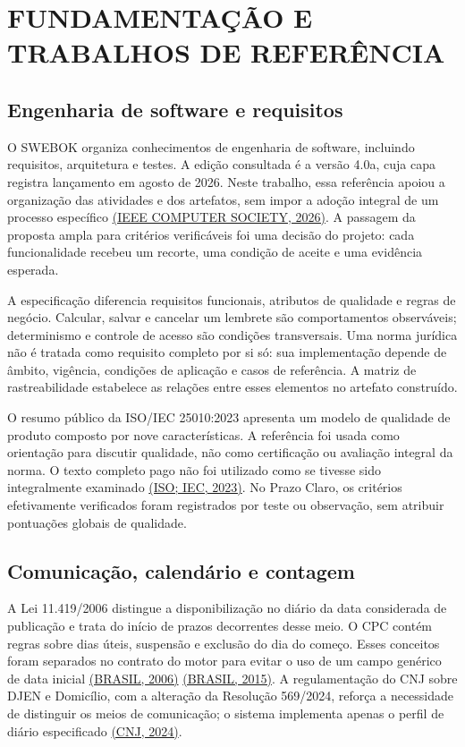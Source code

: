 \chapter{FUNDAMENTAÇÃO E TRABALHOS DE REFERÊNCIA}
\label{chapter-2}
\section{Engenharia de software e requisitos}
\label{section-2-1}
O SWEBOK organiza conhecimentos de engenharia de software, incluindo requisitos, arquitetura e testes. A edição consultada é a versão 4.0a, cuja capa registra lançamento em agosto de 2026. Neste trabalho, essa referência apoiou a organização das atividades e dos artefatos, sem impor a adoção integral de um processo específico \hyperref[ref:SWEBOK]{(IEEE COMPUTER SOCIETY, 2026)}. A passagem da proposta ampla para critérios verificáveis foi uma decisão do projeto: cada funcionalidade recebeu um recorte, uma condição de aceite e uma evidência esperada.

A especificação diferencia requisitos funcionais, atributos de qualidade e regras de negócio. Calcular, salvar e cancelar um lembrete são comportamentos observáveis; determinismo e controle de acesso são condições transversais. Uma norma jurídica não é tratada como requisito completo por si só: sua implementação depende de âmbito, vigência, condições de aplicação e casos de referência. A matriz de rastreabilidade estabelece as relações entre esses elementos no artefato construído.

O resumo público da ISO/IEC 25010:2023 apresenta um modelo de qualidade de produto composto por nove características. A referência foi usada como orientação para discutir qualidade, não como certificação ou avaliação integral da norma. O texto completo pago não foi utilizado como se tivesse sido integralmente examinado \hyperref[ref:ISO25010]{(ISO; IEC, 2023)}. No Prazo Claro, os critérios efetivamente verificados foram registrados por teste ou observação, sem atribuir pontuações globais de qualidade.

\section{Comunicação, calendário e contagem}
\label{section-2-2}
A Lei 11.419/2006 distingue a disponibilização no diário da data considerada de publicação e trata do início de prazos decorrentes desse meio. O CPC contém regras sobre dias úteis, suspensão e exclusão do dia do começo. Esses conceitos foram separados no contrato do motor para evitar o uso de um campo genérico de data inicial \hyperref[ref:LEI11419]{(BRASIL, 2006)} \hyperref[ref:CPC]{(BRASIL, 2015)}. A regulamentação do CNJ sobre DJEN e Domicílio, com a alteração da Resolução 569/2024, reforça a necessidade de distinguir os meios de comunicação; o sistema implementa apenas o perfil de diário especificado \hyperref[ref:CNJ569]{(CNJ, 2024)}.

